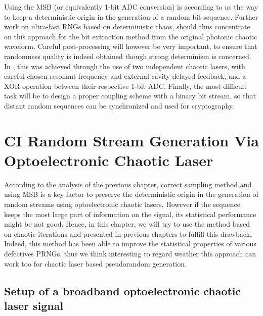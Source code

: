 Using the MSB (or equivalently 1-bit ADC conversion) is according to
us the way to keep a deterministic origin in the generation of a
random bit sequence. Further work on ultra-fast RNGs based on
deterministic chaos, should thus concentrate on this approach for the
bit extraction method from the original photonic chaotic
waveform. Careful post-processing will however be very important, to
ensure that randomness quality is indeed obtained though strong
determinism is concerned. In \cite{fast}, this was achieved through
the use of two independent chaotic lasers, with careful chosen
resonant frequency and external cavity delayed feedback, and a XOR
operation between their respective 1-bit ADC. Finally, the most
difficult task will be to design a proper coupling scheme with a
binary bit stream, so that distant random sequences can be
synchronized and used for cryptography.





\chapter{CI Random Stream Generation Via Optoelectronic Chaotic Laser}
\label{CI Random Stream Generation Via Optoelectronic Chaotic Laser}

According to the analysis of the previous chapter, correct sampling method and using MSB is a key factor to preserve
 the deterministic origin in the generation of random streams using optoelectronic
chaotic lasers. However if the sequence keeps the most large part of information on the signal, its statistical performance might be not good.
Hence, in this chapter, we will try to use the method based on chaotic iterations
and presented in previous chapters to fulfill this drawback.
Indeed, this method has been able to improve the statistical properties of
various defectives PRNGs, thus we think interesting to regard weather this
approach can work too for chaotic laser based pseudorandom generation.

\section{Setup of a broadband optoelectronic chaotic laser signal}

